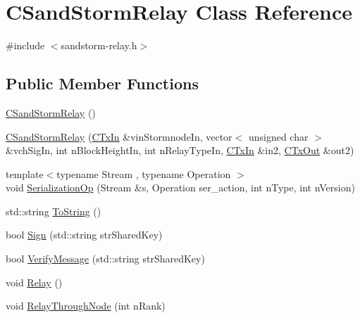 \hypertarget{class_c_sand_storm_relay}{}\section{C\+Sand\+Storm\+Relay Class Reference}
\label{class_c_sand_storm_relay}


{\ttfamily \#include $<$sandstorm-\/relay.\+h$>$}

\subsection*{Public Member Functions}
\begin{DoxyCompactItemize}
\item 
\hyperlink{class_c_sand_storm_relay_a160bb012209e966517008f4ac568d6e6}{C\+Sand\+Storm\+Relay} ()
\item 
\hyperlink{class_c_sand_storm_relay_a4d0da1c322375def1ed4da99aa8289a3}{C\+Sand\+Storm\+Relay} (\hyperlink{class_c_tx_in}{C\+Tx\+In} \&vin\+Stormnode\+In, vector$<$ unsigned char $>$ \&vch\+Sig\+In, int n\+Block\+Height\+In, int n\+Relay\+Type\+In, \hyperlink{class_c_tx_in}{C\+Tx\+In} \&in2, \hyperlink{class_c_tx_out}{C\+Tx\+Out} \&out2)
\item 
{\footnotesize template$<$typename Stream , typename Operation $>$ }\\void \hyperlink{class_c_sand_storm_relay_a8fba7af50034e76090056c3bed8b7378}{Serialization\+Op} (Stream \&s, Operation ser\+\_\+action, int n\+Type, int n\+Version)
\item 
std\+::string \hyperlink{class_c_sand_storm_relay_aca18b7e41e812d174624d15730451333}{To\+String} ()
\item 
bool \hyperlink{class_c_sand_storm_relay_a7263335082b2638b8eafc59e21e79baa}{Sign} (std\+::string str\+Shared\+Key)
\item 
bool \hyperlink{class_c_sand_storm_relay_add9d29eac76800e8d07ced2e0b3eec4b}{Verify\+Message} (std\+::string str\+Shared\+Key)
\item 
void \hyperlink{class_c_sand_storm_relay_a267e6fecd0b7381cfe31c75fba023129}{Relay} ()
\item 
void \hyperlink{class_c_sand_storm_relay_aae4c929f8831a4c678812b1da8f82a55}{Relay\+Through\+Node} (int n\+Rank)
\end{DoxyCompactItemize}
